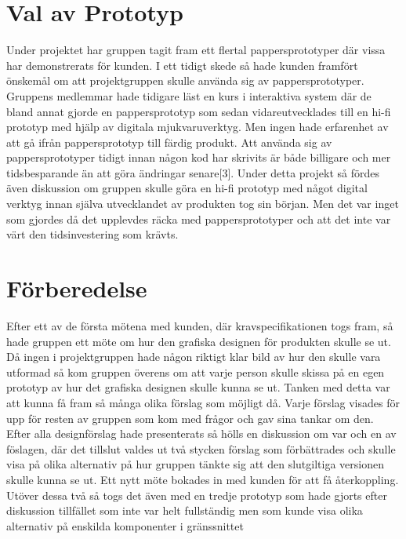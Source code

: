 \section{Val av Prototyp} 
Under projektet har gruppen tagit fram ett flertal pappersprototyper där vissa  har demonstrerats för kunden. I ett tidigt skede så hade kunden framfört önskemål om att projektgruppen skulle använda sig av pappersprototyper. Gruppens medlemmar hade tidigare läst en kurs i interaktiva system där de bland annat gjorde en pappersprototyp som sedan vidareutvecklades till en hi-fi prototyp med hjälp av digitala mjukvaruverktyg. Men ingen hade erfarenhet av att gå ifrån pappersprototyp till färdig produkt. Att använda sig av pappersprototyper tidigt innan någon kod har skrivits är både billigare och mer tidsbesparande än att göra ändringar senare[3]. Under detta projekt så fördes även diskussion om gruppen skulle göra en hi-fi prototyp med något digital verktyg innan själva utvecklandet av produkten tog sin början. Men det var inget som gjordes då det upplevdes räcka med pappersprototyper och att det inte var värt den tidsinvestering som krävts.      

 \section{Förberedelse}
Efter ett av de första mötena med kunden, där kravspecifikationen togs fram, så hade gruppen ett möte om hur den grafiska designen för produkten  skulle se ut. Då ingen i projektgruppen hade någon riktigt klar bild av hur den skulle vara utformad så kom gruppen överens om att varje person skulle skissa på en egen prototyp av hur det grafiska designen skulle kunna se ut. Tanken med detta var att kunna få fram så många olika förslag som möjligt då. Varje förslag visades för upp för resten av gruppen som kom med frågor och gav sina tankar om den. Efter alla designförslag hade presenterats så hölls en diskussion om var och en av föslagen, där det tillslut valdes ut två stycken förslag som förbättrades och skulle visa på olika alternativ på hur gruppen tänkte sig att den slutgiltiga versionen skulle kunna se ut. Ett nytt möte bokades in med kunden för att få återkoppling. Utöver dessa två så togs det även med en tredje prototyp som hade gjorts efter diskussion tillfället som inte var helt fullständig men som kunde visa olika alternativ på enskilda komponenter i gränssnittet


